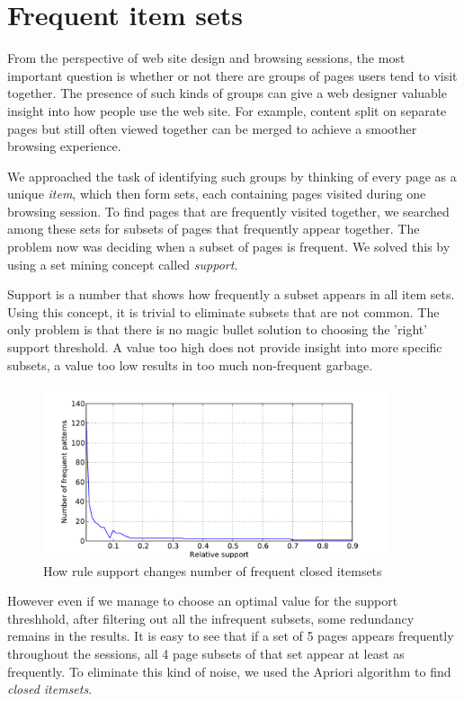 \documentclass[english,a4paper]{article}
\begin{document}
\section{Frequent item sets} 
From the perspective of web site design and browsing sessions, the most important question is whether or not there are groups of pages users tend to visit together. The presence of such kinds of groups can give a web designer valuable insight into how people use the web site. For example, content split on separate pages but still often viewed together can be merged to achieve a smoother browsing experience.

We approached the task of identifying such groups by thinking of every page as a unique \emph{item}, which then form sets, each containing pages visited during one browsing session. To find pages that are frequently visited together, we searched among these sets for subsets of pages that frequently appear together. The problem now was deciding when a subset of pages is frequent. We solved this by using a set mining \cite{frequent_item_set_mining} concept called \emph{support}.

Support is a number that shows how frequently a subset appears in all item sets. Using this concept, it is trivial to eliminate subsets that are not common. The only problem is that there is no magic bullet solution to choosing the 'right' support threshold. A value too high does not provide insight into more specific subsets, a value too low results in too much non-frequent garbage.
\begin{figure}[H]
  \centering
      \includegraphics[width=0.9\textwidth]{apriori_closed_itemset_count}
  \caption{How rule support changes number of frequent closed itemsets}
\end{figure}


However even if we manage to choose an optimal value for the support threshhold, after filtering out all the infrequent subsets, some redundancy remains in the results. It is easy to see that if a set of 5 pages appears frequently throughout the sessions, all 4 page subsets of that set appear at least as frequently. To eliminate this kind of noise, we used the Apriori algorithm \cite{apriori} to find \emph{closed itemsets}.
\end{document}
